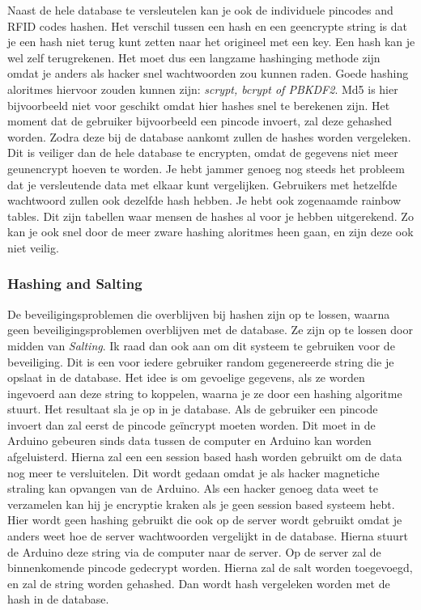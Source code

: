 \documentclass{article}
\begin{document}
Naast de hele database te versleutelen kan je ook de individuele pincodes and RFID codes hashen.
Het verschil tussen een hash en een ge\:encrypte string is dat je een hash niet terug kunt zetten naar het origineel met een key. 
Een hash kan je wel zelf terugrekenen.
Het moet dus een langzame hashinging methode zijn omdat je anders als hacker snel wachtwoorden zou kunnen raden.
Goede hashing aloritmes hiervoor zouden kunnen zijn: \emph{scrypt, bcrypt of PBKDF2}.
Md5 is hier bijvoorbeeld niet voor geschikt omdat hier hashes snel te berekenen zijn.
Het moment dat de gebruiker bijvoorbeeld een pincode invoert, zal deze gehashed worden.
Zodra deze bij de database aankomt zullen de hashes worden vergeleken.
Dit is veiliger dan de hele database te encrypten, omdat de gegevens niet meer geunencrypt hoeven te worden.
Je hebt jammer genoeg nog steeds het probleem dat je versleutende data met elkaar kunt vergelijken.
Gebruikers met hetzelfde wachtwoord zullen ook dezelfde hash hebben.
Je hebt ook zogenaamde rainbow tables.
Dit zijn tabellen waar mensen de hashes al voor je hebben uitgerekend.
Zo kan je ook snel door de meer zware hashing aloritmes heen gaan, en zijn deze ook niet veilig.

\hfill

\centerline{  }

\newpage

\subsubsection{Hashing and Salting}

De beveiligingsproblemen die overblijven bij hashen zijn op te lossen, waarna geen beveiligingsproblemen overblijven met de database.
Ze zijn op te lossen door midden van \emph{Salting}.
Ik raad dan ook aan om dit systeem te gebruiken voor de beveiliging.
Dit is een voor iedere gebruiker random gegenereerde string die je opslaat in de database.
Het idee is om gevoelige gegevens, als ze worden ingevoerd aan deze string to koppelen, waarna je ze door een hashing algoritme stuurt.
Het resultaat sla je op in je database.
Als de gebruiker een pincode invoert dan zal eerst de pincode ge\"incrypt moeten worden.
Dit moet in de Arduino gebeuren sinds data tussen de computer en Arduino kan worden afgeluisterd.
Hierna zal een een session based hash worden gebruikt om de data nog meer te versluitelen.
Dit wordt gedaan omdat je als hacker magnetiche straling kan opvangen van de Arduino.
Als een hacker genoeg data weet te verzamelen kan hij je encryptie kraken als je geen session based systeem hebt.
Hier wordt geen hashing gebruikt die ook op de server wordt gebruikt omdat je anders weet hoe de server wachtwoorden vergelijkt in de database.
Hierna stuurt de Arduino deze string via de computer naar de server.
Op de server zal de binnenkomende pincode gedecrypt worden.
Hierna zal de salt worden toegevoegd, en zal de string worden gehashed.
Dan wordt hash vergeleken worden met de hash in de database.
\end{document}
